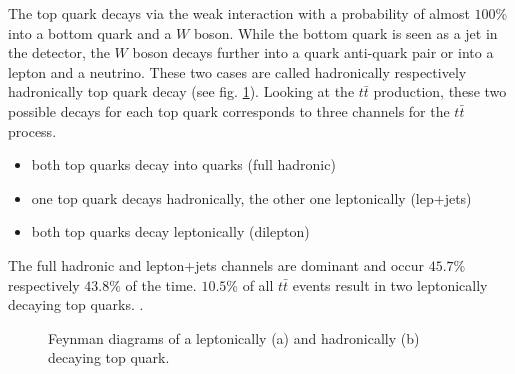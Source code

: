 	The top quark decays via the weak interaction with a probability of almost $100\%$ into a bottom quark and a $W$ boson. While the bottom quark is seen as a jet in the detector, the $W$ boson decays further into a quark anti-quark pair or into a lepton and a neutrino. These two cases are called hadronically respectively hadronically top quark decay (see fig. \ref{fig:decay}). Looking at the $t\bar{t}$ production, these two possible decays for each top quark corresponds to three channels for the $t\bar{t}$ process. 
	\begin{itemize}
	\item both top quarks decay into quarks (full hadronic)
	\item one top quark decays hadronically, the other one leptonically (lep+jets)
	\item both top quarks decay leptonically (dilepton)
	\end{itemize}
	The full hadronic and lepton+jets channels are dominant and occur $45.7\%$ respectively $43.8\%$ of the time. $10.5\%$ of all $t\bar{t}$ events result in two leptonically decaying top quarks. \cite{pdg2016}.
	\begin{figure}
	\begin{subfigure}{.5\textwidth}
		\caption{}
	\end{subfigure}
	\begin{subfigure}{.5\textwidth}
		\caption{}
	\end{subfigure}
	\caption{Feynman diagrams \cite{feynman} of a leptonically (a) and hadronically (b) decaying top quark.}
	\label{fig:decay}
	\end{figure}
	
